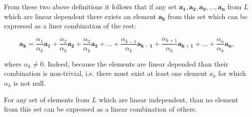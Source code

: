 \documentclass{book}
\begin{document}
From these two above definitions it follows that if any set $\boldsymbol{a_1}, \boldsymbol{a_2}, \boldsymbol{a_3},..., \boldsymbol{a_n}$ from $L$ which are linear dependent there exists an element $\boldsymbol{a_k}$ from this set which can be expressed as a liner combination of the rest:

\[\boldsymbol{a_k} = \frac{\alpha_1}{\alpha_k}\boldsymbol{a_1} + \frac{\alpha_2}{\alpha_k}\boldsymbol{a_2} + \frac{\alpha_3}{\alpha_k}\boldsymbol{a_3} + ... +  \frac{\alpha_{k-1}}{\alpha_k}\boldsymbol{a_{k-1}} + \frac{\alpha_{k+1}}{\alpha_k}\boldsymbol{a_{k+1}} + ... + \frac{\alpha_n}{\alpha_k}\boldsymbol{a_n} ,\]

where $\alpha_k \neq 0$. Indeed, because the elements are linear depended than their combination is non-trivial, i.e. there must exist at least one element $a_k$ for which $\alpha_k$ is not null. 

For any set of elements from $L$ which are linear independent, than no element from this set can be expressed as a linear combination of others.
\end{document}
